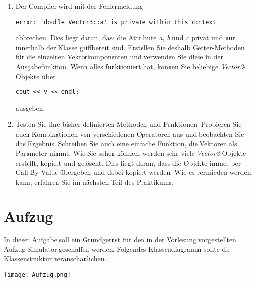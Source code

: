 \documentclass[
  accentcolor=tud1c,	%
  colorbacktitle,		%
  inverttitle,			%
  german,				%
  twoside
]{tudexercise}
\begin{document}
\begin{enumerate}
\item
Der Compiler wird mit der Fehlermeldung 
\begin{verbatim}
error: 'double Vector3::a' is private within this context
\end{verbatim}
abbrechen. Dies liegt daran, dass die Attribute \emph{a}, \emph{b} und \emph{c} privat und nur innerhalb der Klasse griffbereit sind. Erstellen Sie deshalb Getter-Methoden für die einzelnen Vektorkomponenten und verwenden Sie diese in der Ausgabefunktion. Wenn alles funktioniert hat, können Sie beliebige \emph{Vector3}-Objekte über 
\begin{lstlisting}
cout << v << endl;
\end{lstlisting} 
ausgeben.

\item
Testen Sie ihre bisher definierten Methoden und Funktionen. Probieren Sie auch Kombinationen von verschiedenen Operatoren aus und beobachten Sie das Ergebnis. Schreiben Sie auch eine einfache Funktion, die Vektoren als Parameter nimmt. Wie Sie sehen können, werden sehr viele \emph{Vector3}-Objekte erstellt, kopiert und gelöscht. Dies liegt daran, dass die Objekte immer per Call-By-Value übergeben und dabei kopiert werden. Wie es vermieden werden kann, erfahren Sie im nächsten Teil des Praktikums.

\end{enumerate}

\section{Aufzug}
In dieser Aufgabe soll ein Grundgerüst für den in der Vorlesung vorgestellten Aufzug-Simulator geschaffen werden. Folgendes Klassendiagramm sollte die Klassenstruktur veranschaulichen.

\texttt{[image: Aufzug.png]}
\end{document}
